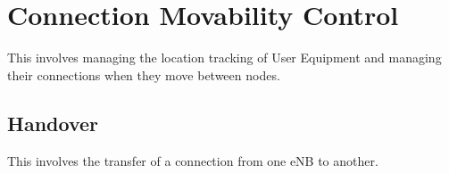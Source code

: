 \section{Connection Movability Control}
{
	This involves managing the location tracking of User Equipment and managing their connections when they move between nodes.
	\subsection{Handover}
	{
		This involves the transfer of a connection from one eNB to another.
	}
}